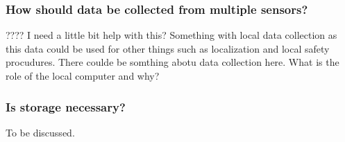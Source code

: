 \subsubsection{How should data be collected from multiple sensors?}
???? I need a little bit help with this?
Something with local data collection as this data could be used for other things such as localization and local safety procudures.
There coulde be somthing abotu data collection here.
What is the role of the local computer and why?







\subsubsection{Is storage necessary?}
To be discussed.

